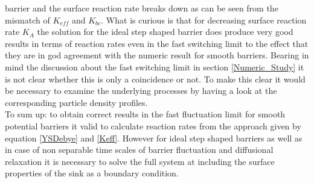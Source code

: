     barrier and the surface reaction rate breaks down as can be seen from the mismatch of $K_{eff}$ and $K_{bc}$.
    What is curious is that for decreasing surface reaction rate $K_A$ the solution for the ideal step shaped barrier does produce very good results in terms of reaction rates even in the fast switching limit to the effect that they are in god agreement with the numeric result for smooth barriers. Bearing in mind the discussion about the fast switching limit in section \ref{Numeric_Study} it is not clear whether this is only a coincidence or not. To make this clear it would be necessary to examine the underlying processes by having a look at the corresponding particle density profiles. \\
To sum up: to obtain correct results in the fast fluctuation limit for smooth potential barriers it valid to calculate reaction rates from the approach given by equation \eqref{YSDebye} and \eqref{Keff}. However for ideal step shaped barriers as well as in case of non separable time scales of barrier fluctuation and diffusional relaxation it is necessary to solve the full system at including the surface properties of the sink as a boundary condition. \\


